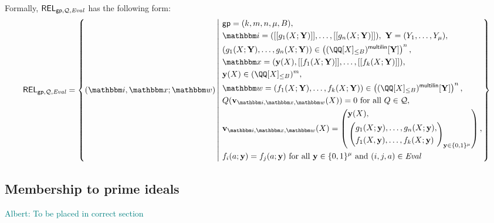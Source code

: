 \documentclass[11pt,letterpaper,usenames,dvipsnames]{article}
\newcommand{\albert}[1]{\textcolor{teal}{Albert: {#1}}}
\begin{document}
    Formally, $\mathsf{REL}_{\mathsf{gp},\mathcal{Q},\text{\emph{Eval}}}$ has the following form:
    \begin{equation*}
    \begin{aligned}
    \REL_{\gparams,\cQ,\evalconstraints} = \left\{ (\idx, \inp ; \wit) \left| \ \begin{aligned}
    & \gparams=(k,m,n,\mu, B),  \\
    & \idx = ( \oracle{g_1(X;\YY)},\ldots, \oracle{g_n(X;\YY)}), \ \YY=(Y_1,\ldots, Y_\mu), \\
            &(g_1(X;\YY),\dots,g_n(X;\YY))\in \left(\mainQpolyringmultilin[\YY]\right)^{n},\\
    & \inp =(\yy(X), \oracle{f_1(X;\YY)}, \ldots, \oracle{f_k(X;\YY)}),\\ &\yy(X)\in \mainQpolyring^{m},\\    
        &\wit = (f_1(X;\YY), \ldots, f_k(X;\YY)) \in \left(\mainQpolyringmultilin[\YY]\right)^{n},\\
        &Q(\vv_{\idx, \inp,\wit}(X)) =0  \text{ for all } Q\in \cQ,\\
        &\vv_{\idx, \inp,\wit}(X) = \left(\begin{aligned}&\yy(X),\\ &\left(\begin{aligned}&g_1(X;\yy),\ldots, g_n(X;\yy),\\ &f_1(X,\yy),\ldots, f_k(X;\yy)\end{aligned}\right)_{\yy\in \BB^\mu}\\
     \end{aligned}\right),\\
        & f_i(a;\yy)=f_j(a;\yy)  \text{ for all } \yy\in \{0,1\}^\mu \text{ and } (i,j,a)\in \evalconstraints
    \end{aligned} \right.\right\}
    \end{aligned}
    \end{equation*}

    \subsection{Membership to prime ideals}
    \albert{To be placed in correct section}
\end{document}

